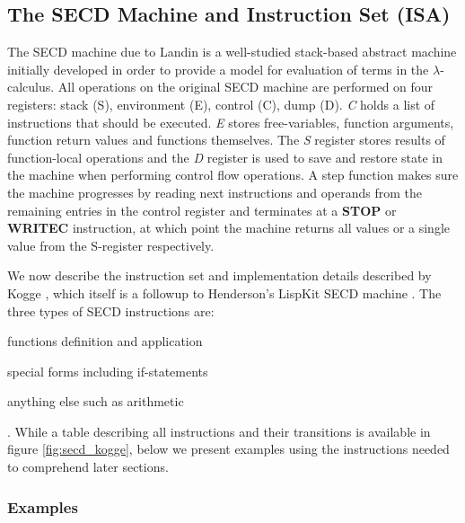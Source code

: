 \documentclass[a4paper,12pt,twoside,openright]{report}
\theoremstyle{definition}
\begin{document}
\subsection{The SECD Machine and Instruction Set (ISA)}
The SECD machine due to Landin \cite{landin1964mechanical} is a well-studied stack-based abstract machine initially developed in order to provide a model for evaluation of terms in the $\lambda$-calculus. All operations on the original SECD machine are performed on four registers: stack (S), environment (E), control (C), dump (D). \textit{C} holds a list of instructions that should be executed. \textit{E} stores free-variables, function arguments, function return values and functions themselves. The \textit{S} register stores results of function-local operations and the \textit{D} register is used to save and restore state in the machine when performing control flow operations. A step function makes sure the machine progresses by reading next instructions and operands from the remaining entries in the control register and terminates at a \textbf{STOP} or \textbf{WRITEC} instruction, at which point the machine returns all values or a single value from the S-register respectively.

We now describe the instruction set and implementation details described by Kogge \cite{kogge1990architecture}, which itself is a followup to Henderson's LispKit SECD machine \cite{henderson1980functional}. The three types of SECD instructions are:
\begin{enumerate*}[label=(\arabic*)]
    \item functions definition and application
    \item special forms including if-statements
    \item anything else such as arithmetic
\end{enumerate*}. While a table describing all instructions and their transitions is available in figure \ref{fig:secd_kogge}, below we present examples using the instructions needed to comprehend later sections.

\subsubsection{Examples}\label{ssubsec:secd_example}
\end{document}
